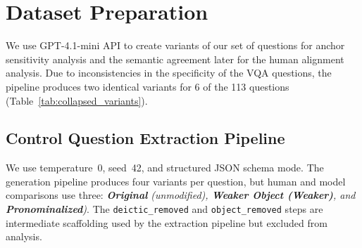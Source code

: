 \documentclass[letterpaper]{article} %
\begin{document}



\section{Dataset Preparation}
\label{app:data}
We use GPT-4.1-mini API to create variants of our set of questions for anchor sensitivity analysis and the semantic agreement later for the human alignment analysis. 
Due to inconsistencies in the specificity of the VQA questions, the pipeline produces two identical variants for 6 of the 113 questions (Table~\ref{tab:collapsed_variants}).


\subsection{Control Question Extraction Pipeline}
\label{app:ctl}
We use temperature~0, seed~42, and structured JSON schema mode. %
The generation pipeline produces four variants per question, but human and model comparisons use three: \textit{\textbf{Original} (unmodified), \textbf{Weaker Object (Weaker)}, and \textbf{Pronominalized})}. The \texttt{deictic\_removed} and \texttt{object\_removed} steps are intermediate scaffolding used by the extraction pipeline but excluded from analysis.
\end{document}
